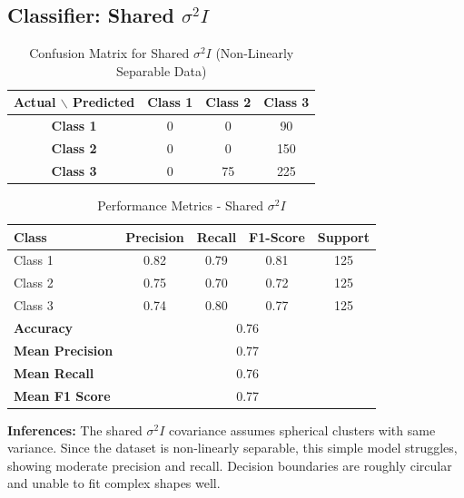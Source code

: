 \subsection{Classifier: Shared $\sigma^2 I$}


\begin{table}[H]
\centering
\caption{Confusion Matrix for Shared $\sigma^2 I$ (Non-Linearly Separable Data)}
\label{tab:confmat_d3_sigma2I}
\begin{tabular}{|c|c|c|c|}
\hline
\textbf{Actual $\backslash$ Predicted} & \textbf{Class 1} & \textbf{Class 2} & \textbf{Class 3} \\
\hline
\textbf{Class 1} & 0 & 0   & 90   \\
\textbf{Class 2} & 0  & 0 & 150   \\
\textbf{Class 3} & 0   & 75   & 225 \\
\hline
\end{tabular}
\end{table}


\begin{table}[H]
\centering
\caption{Performance Metrics - Shared $\sigma^2 I$}
\begin{tabular}{lcccc}
\toprule
\textbf{Class} & \textbf{Precision} & \textbf{Recall} & \textbf{F1-Score} & \textbf{Support} \\
\midrule
Class 1 & 0.82 & 0.79 & 0.81 & 125 \\
Class 2 & 0.75 & 0.70 & 0.72 & 125 \\
Class 3 & 0.74 & 0.80 & 0.77 & 125 \\
\midrule
\textbf{Accuracy} & \multicolumn{4}{c}{0.76} \\
\textbf{Mean Precision} & \multicolumn{4}{c}{0.77} \\
\textbf{Mean Recall} & \multicolumn{4}{c}{0.76} \\
\textbf{Mean F1 Score} & \multicolumn{4}{c}{0.77} \\
\bottomrule
\end{tabular}
\end{table}

\textbf{Inferences:}  
The shared $\sigma^2 I$ covariance assumes spherical clusters with same variance. Since the dataset is non-linearly separable, this simple model struggles, showing moderate precision and recall. Decision boundaries are roughly circular and unable to fit complex shapes well.


